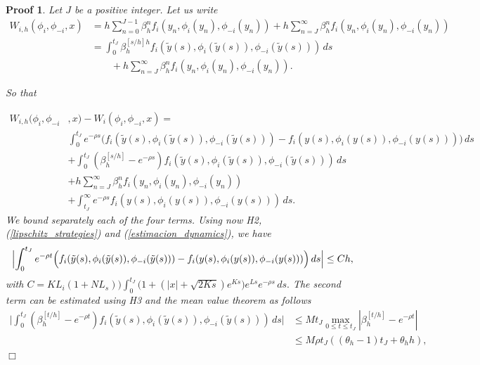 \documentclass[12pt]{article}
\newtheorem{Proof}{Proof}
\newenvironment{proof}{\begin{Proof}\rm}{\hfill $\Box$ \end{Proof}}
\begin{document}
\begin{proof}
Let $J$ be a positive integer. Let us write
\begin{equation*}
\begin{split}
W_{i,h}(\phi_{i},\phi_{-i},x) &=
h\sum_{n=0}^{J-1}\beta_h^nf_i(y_n,\phi_i(y_n),\phi_{-i}(y_n))
+h\sum_{n=J}^\infty\beta_h^nf_i(y_n,\phi_i(y_n),\phi_{-i}(y_n))\\
&=\int_0^{t_J}\beta_h^{[s/h]h}f_i(\tilde{y}(s),\phi_i(\tilde{y}(s)),\phi_{-i}(\tilde{y}(s)))\, ds\\
&\qquad+h\sum_{n=J}^\infty\beta_h^nf_i(y_n,\phi_i(y_n),\phi_{-i}(y_n)).
\end{split}
\end{equation*}

So that

\begin{equation}\label{estimation_functional}
\begin{split}
W_{i,h}(\phi_{i},\phi_{-i}&,x)-W_{i}(\phi_{i},\phi_{-i},x)=\\
&\int_0^{t_J}e^{-\rho s}\bigl(f_i(\tilde{y}(s),\phi_i(\tilde{y}(s)),\phi_{-i}(\tilde{y}(s)))
-f_i({y}(s),\phi_i({y}(s)),\phi_{-i}({y}(s))) \bigr )\, ds\\
&+\int_0^{t_J}(\beta_h^{[s/h]}-e^{-\rho s})f_i(\tilde{y}(s),\phi_i(\tilde{y}(s)),\phi_{-i}(\tilde{y}(s)))\, ds\\
&+h\sum_{n=J}^\infty\beta_h^nf_i(y_n,\phi_i(y_n),\phi_{-i}(y_n))\\
&+\int_{t_J}^\infty e^{-\rho s}f_i({y}(s),\phi_i({y}(s)),\phi_{-i}({y}(s))) \, ds.
\end{split}
\end{equation}
We bound separately each of the four terms. Using now H2, (\ref{lipschitz_strategies}) and (\ref{estimacion_dynamics}),  we have
\begin{equation*}
\Bigl |\int_0^{t_J}e^{-\rho t}\Bigl(f_i(\tilde{y}(s),\phi_i(\tilde{y}(s)),\phi_{-i}(\tilde{y}(s)))
-f_i({y}(s),\phi_i({y}(s)),\phi_{-i}({y}(s))) \Bigr )\, ds\Bigr |\le Ch,
\end{equation*}
with $C=KL_i(1+NL_s))\int_0^{t_J} \bigl(1+(|x|+\sqrt{2Ks})e^{Ks}\bigr)e^{Ls}e^{-\rho s} \, ds.$
The second term can be estimated using H3 and the mean value theorem as follows
\begin{equation*}
\begin{split}
\bigl
|\int_0^{t_J}(\beta_h^{[t/h]}-e^{-\rho t})f_i(\tilde{y}(s),\phi_i(\tilde{y}(s)),\phi_{-i}(\tilde{y}(s)))\, ds\bigr|&\le
Mt_J\max_{0\le t\le t_J} |\beta_h^{[t/h]}-e^{-\rho t}|\\
&\le M\rho t_J((\theta_h-1)t_J+\theta_hh),

\end{split}
\end{equation*}
\end{proof}
\end{document}
